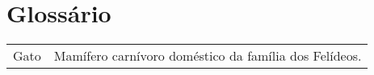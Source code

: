 \chapter*{Glossário}

\begin{tabular}{ll}
Gato &  Mamífero carnívoro doméstico da família dos Felídeos.
\end{tabular}
